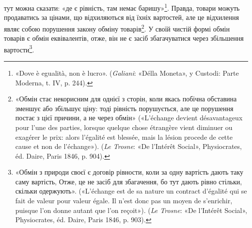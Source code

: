 \parcont{}  %
тут можна сказати: «де є рівність, там немає баришу»\footnote{
«Dove è egualità, non è lucro». (\emph{Galiani}: «Délla Moneta», y Custodi:
Parte Moderna, t. IV, p. 244).
}. Правда,
товари можуть продаватись за цінами, що відхиляються від їхніх
вартостей, але це відхилення являє собою порушення закону
обміну товарів\footnote{
«Обмін стає некорисним для однієї з сторін, коли якась побічна
обставина зменшує або збільшує ціну: тоді рівність порушується, але це
порушення постає з цієї причини, а не через обмін» («L’échange devient
désavantageux pour l’une des parties, lorsque quelque chose étrangère vient
diminuer ou exagérer le prix: alors l’égalité est blessée, mais la lésion procede
de cette cause et non de l’échange»). (\emph{Le Trosne}: «De l’Intérêt Social»,
Physiocrates, éd. Daire, Paris 1846, p. 904).
}. У своїй чистій формі обмін товарів є обмін
еквівалентів, отже, він не є засіб збагачуватися через збільшення
вартости\footnote{
«Обмін з природи своєї є договір рівности, коли за одну вартість
дають таку саму вартість, Отже, це не засіб для збагачення, бо тут
дають рівно стільки, скільки одержують». («L’échange est de sa nature
un contract d’égalité qui se fait de valeur pour valeur égale. Il n’est
donc pas un moyen de s’enrichir, puisque l’on donne autant que l’on
reçoit»). (\emph{Le Trosne}: «De l’Intérêt Social», Physiocrates, éd. Daire, Paris
1846, p. 903).
}.

